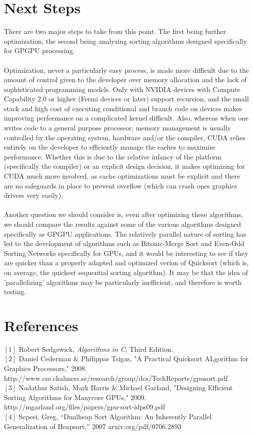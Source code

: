 \documentclass{article}
\begin{document}
\section{Next Steps}
There are two major steps to take from this point. The first being further optimization, the second being analyzing sorting algorithms designed specifically for GPGPU processing.\\
\\
Optimization, never a particularly easy process, is made more difficult due to the amount of control given to the developer over memory allocation and the lack of sophisticated programming models. Only with NVIDIA devices with Compute Capability 2.0 or higher (Fermi devices or later) support recursion, and the small stack and high cost of executing conditional and branch code on devices makes improving performance on a complicated kernel difficult. Also, whereas when one writes code to a general purpose processor, memory management is usually controlled by the operating system, hardware and/or the compiler, CUDA relies entirely on the developer to efficiently manage the caches to maximize performance. Whether this is due to the relative infancy of the platform (specifically the compiler) or an explicit design decision, it makes optimizing for CUDA much more involved, as cache optimizations must be explicit and there are no safeguards in place to prevent overflow (which can crash ones graphics drivers very easily).\\
\\
Another question we should consider is, even after optimizing these algorithms, we should compare the results against some of the various algorithms designed specifically as GPGPU applications. The relatively parallel nature of sorting has led to the development of algorithms such as Bitonic-Merge Sort and Even-Odd Sorting Networks specifically for GPUs, and it would be interesting to see if they are quicker than a properly adapted and optimized verion of Quicksort (which is, on average, the quickest sequential sorting algorithm). It may be that the idea of 'parallelizing' algorithms may be particularly inefficient, and therefore is worth testing.
\section{References}
$[1]$ Robert Sedgewick, {\em Algorithms in C}, Third Edition.\\
$[2]$ Daniel Cederman $\&$ Philippas Tsigas, "A Practical Quicksort ALgorithm for Graphics Processors," 2008. http://www.cse.chalmers.se/research/group/dcs/TechReports/gpusort.pdf\\
$[3]$ Nadathur Satish, Mark Harris $\&$ Michael Garland, "Designing Efficient Sorting Algorithms for Manycore GPUs," 2009. http://mgarland.org/files/papers/gpu-sort-idps09.pdf\\
$[4]$  Sepesi, Greg, ``Dualheap Sort Algorithm:  An Inherently Parallel Generalization of Heapsort,'' 2007 arxiv.org/pdf/0706.2893
\end{document}
